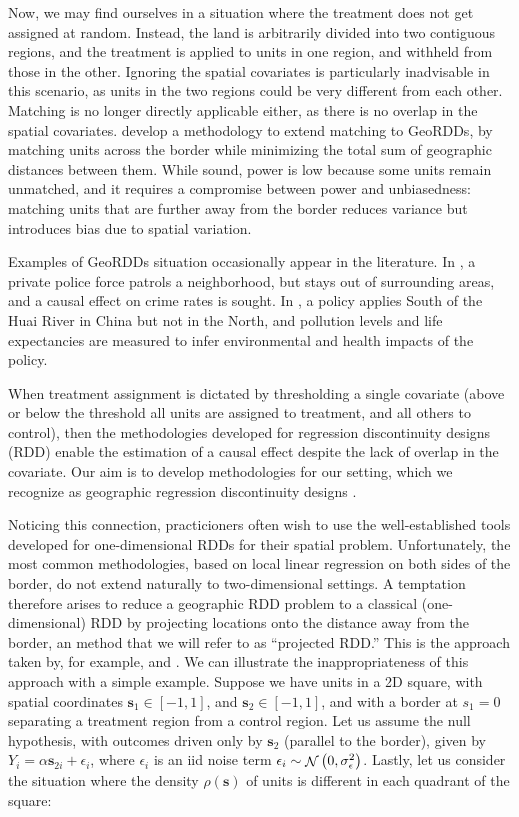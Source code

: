 \documentclass[letter]{article}
\DeclareMathOperator{\normal}{\mathcal{N}}
\newcommand{\sigman}{\sigma_{\epsilon}}
\newcommand{\svec}{\mathbold{s}}
\renewcommand{\cite}[1]{\citep{#1}}
\begin{document}
Now, we may find ourselves in a situation where the treatment does not get assigned at random.
Instead, the land is arbitrarily divided into two contiguous regions, and the treatment is applied to units in one region, and withheld from those in the other.
Ignoring the spatial covariates is particularly inadvisable in this scenario, as units in the two regions could be very different from each other.
Matching is no longer directly applicable either, as there is no overlap in the spatial covariates.
\cite{keele2015enhancing} develop a methodology to extend matching to GeoRDDs, by matching units across the border while minimizing the total sum of geographic distances between them.
While sound, power is low because some units remain unmatched, and it requires a compromise between power and unbiasedness: matching units that are further away from the border reduces variance but introduces bias due to spatial variation.

Examples of GeoRDDs situation occasionally appear in the literature. In \cite{macdonald2015effect}, a private police force patrols a neighborhood, but stays out of surrounding areas, and a causal effect on crime rates is sought. In \cite{chen2013evidence}, a policy applies South of the Huai River in China but not in the North, and pollution levels and life expectancies are measured to infer environmental and health impacts of the policy.

When treatment assignment is dictated by thresholding a single covariate (above or below the threshold all units are assigned to treatment, and all others to control), then the methodologies developed for regression discontinuity designs (RDD) enable the estimation of a causal effect despite the lack of overlap in the covariate. Our aim is to develop methodologies for our setting, which we recognize as geographic regression discontinuity designs \cite{keele_titiunik_2015}.

Noticing this connection, practicioners often wish to use the well-established tools developed for one-dimensional RDDs for their spatial problem.
Unfortunately, the most common methodologies, based on local linear regression on both sides of the border, do not extend naturally to two-dimensional settings.
A temptation therefore arises to reduce a geographic RDD problem to a classical (one-dimensional) RDD by projecting locations onto the distance away from the border, an method that we will refer to as ``projected RDD.''
This is the approach taken by, for example, \cite{macdonald2015effect} and \cite{chen2013evidence}. We can illustrate the inappropriateness of this approach with a simple example.
Suppose we have units in a 2D square, with spatial coordinates \(\svec_1 \in [-1,1]\), and \(\svec_2 \in [-1,1]\), and with a border at \(s_1=0\) separating a treatment region from a control region.
Let us assume the null hypothesis, with outcomes driven only by \(\svec_2\) (parallel to the border), given by \(Y_{i} = \alpha \svec_{2i} + \epsilon_i\),
where \(\epsilon_i\) is an iid noise term \(\epsilon_i \sim \normal\del{0, \sigman^2}\).
Lastly, let us consider the situation where the density \(\rho(\svec)\) of units is different in each quadrant of the square:
\end{document}
